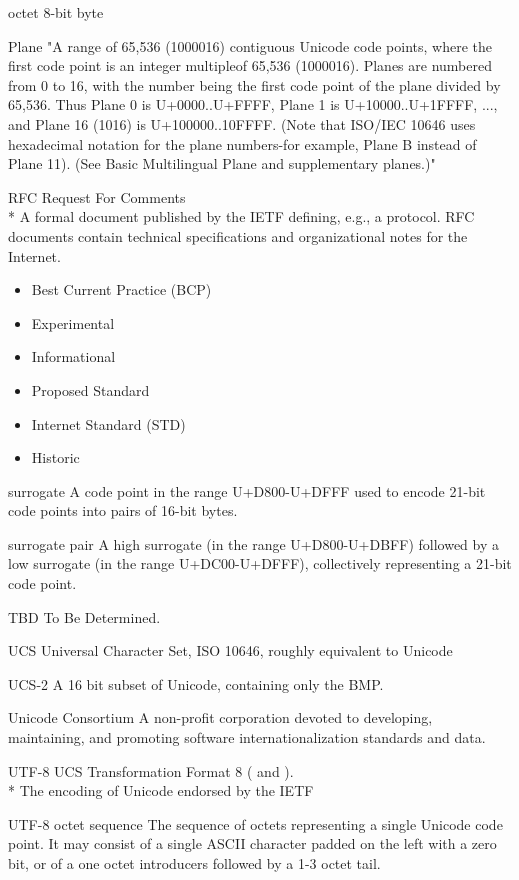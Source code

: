 \documentclass[b4paper]{article}
\begin{document}
\begin{definition}
\item [octet] 8-bit byte
\item [Plane] "A range of 65,536 (1000016) contiguous Unicode code
points, where the first code point is an integer multipleof 65,536
(1000016). Planes are numbered from 0 to 16, with the number being the
first code point of the plane divided by 65,536. Thus Plane 0 is
U+0000..U+FFFF, Plane 1 is U+10000..U+1FFFF, ..., and Plane 16 (1016)
is U+100000..10FFFF. (Note that ISO/IEC 10646 uses hexadecimal
notation for the plane numbers-for example, Plane B instead of Plane
11). (See Basic Multilingual Plane and supplementary planes.)"
\item [RFC] Request For Comments
\\*
A formal document published by the IETF defining, e.g., a protocol.
RFC documents contain technical specifications and organizational notes for the Internet.
\begin{itemize}
  \item Best Current Practice (BCP)
  \item Experimental
  \item Informational
  \item Proposed Standard
  \item Internet Standard (STD)
  \item Historic
\end{itemize}
\item [surrogate] A code point in the range U+D800-U+DFFF used to
encode 21-bit code points into pairs of 16-bit bytes.
\item [surrogate pair] A high surrogate (in the range U+D800-U+DBFF)
followed by a low surrogate (in the range U+DC00-U+DFFF),
collectively representing a 21-bit code point.
\item [TBD] To Be Determined.
\item [UCS] Universal Character Set, ISO 10646, roughly equivalent to Unicode
\item [UCS-2] A 16 bit subset of Unicode, containing only the BMP.
\item [Unicode Consortium] A non-profit corporation devoted to
developing, maintaining, and promoting software internationalization standards and data.
\item [UTF-8] UCS Transformation Format 8
(\cite{USTD:3.9} and \cite{RFC:3629}).
\\*
The encoding of Unicode endorsed by the IETF
\item [UTF-8 octet sequence]
The sequence of octets representing a single Unicode code point.
It may consist of a single ASCII character padded on the left with a zero bit,
or of a one octet introducers followed by a 1-3 octet tail.


\end{definition}
\end{document}
